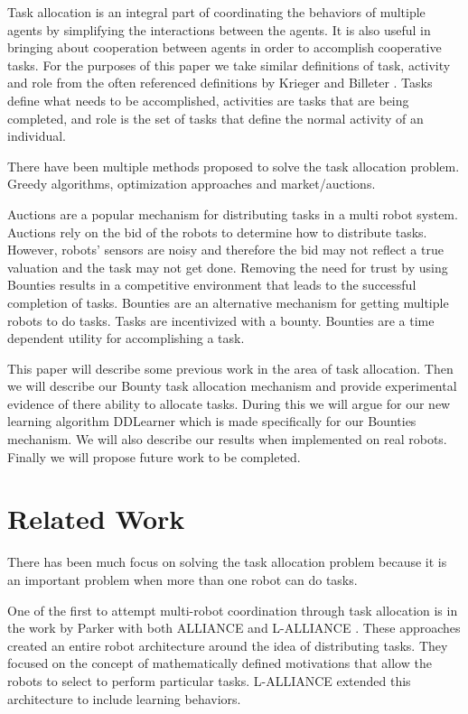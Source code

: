 \documentclass[twocolumn]{article}
\begin{document}
Task allocation is an integral part of coordinating the behaviors of multiple agents by simplifying the interactions between the agents.  It is also useful in bringing about cooperation between agents in order to accomplish cooperative tasks.  For the purposes of this paper we take similar definitions of task, activity and role from the often referenced definitions by Krieger and Billeter \cite{Krieger2000}.  Tasks define what needs to be accomplished, activities are tasks that are being completed, and role is the set of tasks that define the normal activity of an individual.

There have been multiple methods proposed to solve the task allocation problem.  Greedy algorithms, optimization approaches and market/auctions.  

Auctions are a popular mechanism for distributing tasks in a multi robot system.  Auctions rely on the bid of the robots to determine how to distribute tasks.  However, robots' sensors are noisy and therefore the bid may not reflect a true valuation and the task may not get done.  Removing the need for trust by using Bounties results in a competitive environment that leads to the successful completion of tasks.
Bounties are an alternative mechanism for getting multiple robots to do tasks.  Tasks are incentivized with a bounty.  Bounties are a time dependent utility for accomplishing a task.  

This paper will describe some previous work in the area of task allocation.  Then we will describe our Bounty task allocation mechanism and provide experimental evidence of there ability to allocate tasks.  During this we will argue for our new learning algorithm DDLearner which is made specifically for our Bounties mechanism.  We will also describe our results when implemented on real robots.  Finally we will propose future work to be completed.

\section{Related Work}
There has been much focus on solving the task allocation problem because it is an important problem when more than one robot can do tasks.  

One of the first to attempt multi-robot coordination through task allocation is in the work by Parker with both ALLIANCE and L-ALLIANCE \cite{Parker1998,Parker1995}.  These approaches created an entire robot architecture around the idea of distributing tasks.  They focused on the concept of mathematically defined motivations that allow the robots to select to perform particular tasks.  L-ALLIANCE extended this architecture to include learning behaviors. 
\end{document}
